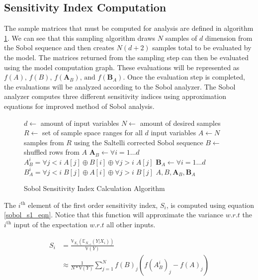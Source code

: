 \subsection{Sensitivity Index Computation\label{sec:si_comp}}
The sample matrices that must be computed for analysis are defined in algorithm \ref{sobol_sample_alg}. We can see that this sampling algorithm draws $N$ samples of $d$ dimension from the Sobol sequence and then creates $N(d+2)$ samples total to be evaluated by the model. The matrices returned from the sampling step can then be evaluated using the model computation graph. These evaluations will be represented as $f(A) \text{, } f(B) \text{, } f(\textbf{A}_{B}) \text{, and } f(\textbf{B}_{A})$. Once the evaluation step is completed, the evaluations will be analyzed according to the Sobol analyzer. The Sobol analyzer computes three different sensitivity indices using approximation equations for \citet{saltelli2010varianceSA} improved method of Sobol analysis.

\begin{figure}
  \label{sobol_sample_alg}
    \begin{algorithmic}[1]
      \State $d \gets $ amount of input variables
      \State $N \gets $ amount of desired samples
      \State $R \gets $ set of sample space ranges for all $d$ input variables
      \State $A \gets N$ samples from $R$ using the Saltelli corrected Sobol sequence
      \State $B \gets $ shuffled rows from $A$
      \State $\textbf{A}_{B} \gets \forall i = 1 \ldots d$ $A_{B}^i = \forall j < i \; A[j] \oplus B[i] \oplus \forall j > i \; A[j]$
      \State $\textbf{B}_{A} \gets \forall i = 1 \ldots d$ $B_{A}^i = \forall j < i \; B[j] \oplus A[i] \oplus \forall j > i \; B[j]$
      \State \Return $A, B, \textbf{A}_{B}, \textbf{B}_{A}$
    \end{algorithmic}
  \caption{Sobol Sensitivity Index Calculation Algorithm}
\end{figure}


The $i^{\text{th}}$ element of the first order sensitivity index, $S_i$, is computed using equation \ref{sobol_s1_eqn}. Notice that this function will approximate the variance $w.r.t$ the $i^{\text{th}}$ input of the expectation $w.r.t$ all other inputs.

\begin{equation} \label{sobol_s1_eqn}
  \begin{split}
    S_i & = \frac{\mathbb{V}_{X_i}\left(\mathbb{E}_{X_{\sim i}}(Y | X_i) \right)}{\mathbb{V}(Y)} \\
     & \approx \frac{1}{N * \mathbb{V}(Y)} \sum_{j=1}^{N} f(B)_j\left( f(A_{B}^{i})_j - f(A)_j\right)
  \end{split}
\end{equation}

